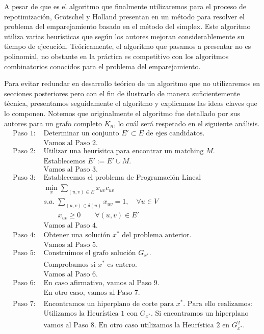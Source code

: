 \documentclass[twoside,a4paper,openright,12pt,tikz]{book}
\begin{document}
A pesar de que es el algoritmo que finalmente utilizaremos para el proceso de repotimización, Grötschel y Holland presentan en \cite{holland} un método para resolver el problema del emparejamiento basado en el método del simplex. Este algoritmo utiliza varias heurísticas que según los autores mejoran considerablemente su tiempo de ejecución. Teóricamente, el algoritmo que pasamos a presentar no es polinomial, no obstante en la práctica es competitivo con los algoritmos combinatorios conocidos para el problema del emparejamiento.

Para evitar redundar en desarrollo teórico de un algoritmo que no utilizaremos en secciones posteriores pero con el fin de ilustrarlo de manera suficientemente técnica, presentamos seguidamente el algoritmo y explicamos las ideas claves que lo componen. Notemos que originalmente el algoritmo fue detallado por sus autores para un grafo completo $K_n$, lo cuál será respetado en el siguiente análisis.
\begin{align*}
\text{Paso 1: }&\text{Determinar un conjunto $E'\subset E$ de ejes candidatos.}\\
&\text{Vamos al Paso 2.}\\
\text{Paso 2: }&\text{Utilizar una heurísitca para encontrar un matching $M$.}\\
&\text{Establecemos $E':=E'\cup M$.}\\
&\text{Vamos al Paso 3.}\\
\text{Paso 3: }& \text{Establecemos el problema de Programación Lineal}\\
& \min_x  \sum_{(u,v) \in E}x_{uv}c_{uv}\\
&s.a.\;\sum_{(u,v)\in\delta(u)} x_{uv} = 1, \quad \forall u \in V\\
&\qquad x_{uv} \geq 0 \qquad \forall(u,v)\in E'\\
&\text{Vamos al Paso 4.}\\
\text{Paso 4: }&\text{Obtener una solución $x^*$ del problema anterior.}\\
&\text{Vamos al Paso 5.}\\
\text{Paso 5: }&\text{Construimos el grafo solución $G_{x^*}$.}\\
&\text{Comprobamos si $x^*$ es entero.}\\
&\text{Vamos al Paso 6.}\\
\text{Paso 6: }& \text{En caso afirmativo, vamos al Paso 9.}\\
&\text{En otro caso, vamos al Paso 7.}\\
\text{Paso 7: }&\text{Encontramos un hiperplano de corte para $x^*$. Para ello realizamos:}\\
&\text{Utilizamos la Heurística 1 con $G_{x^*}$. Si encontramos un hiperplano}\\
&\text{vamos al Paso 8. En otro caso utilizamos la Heurística 2 en $G^2_{x^*}$.}\\
\end{align*}
\end{document}
